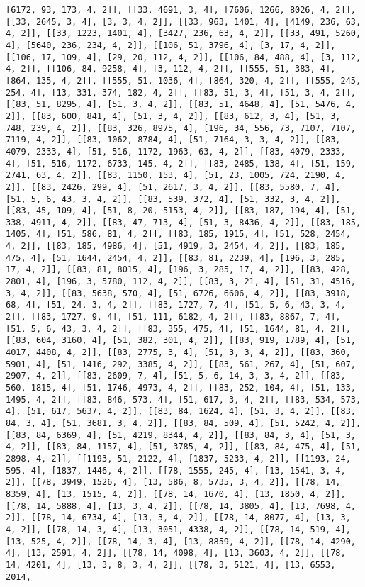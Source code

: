 \documentclass[12pt,fleqn]{article}\usepackage{../../common}
\begin{document}
\begin{verbatim}
[6172, 93, 173, 4, 2]], [[33, 4691, 3, 4], [7606, 1266, 8026, 4, 2]], [[33, 2645, 3, 4], [3, 3, 4, 2]], [[33, 963, 1401, 4], [4149, 236, 63, 4, 2]], [[33, 1223, 1401, 4], [3427, 236, 63, 4, 2]], [[33, 491, 5260, 4], [5640, 236, 234, 4, 2]], [[106, 51, 3796, 4], [3, 17, 4, 2]], [[106, 17, 109, 4], [29, 20, 112, 4, 2]], [[106, 84, 488, 4], [3, 112, 4, 2]], [[106, 84, 9258, 4], [3, 112, 4, 2]], [[555, 51, 383, 4], [864, 135, 4, 2]], [[555, 51, 1036, 4], [864, 320, 4, 2]], [[555, 245, 254, 4], [13, 331, 374, 182, 4, 2]], [[83, 51, 3, 4], [51, 3, 4, 2]], [[83, 51, 8295, 4], [51, 3, 4, 2]], [[83, 51, 4648, 4], [51, 5476, 4, 2]], [[83, 600, 841, 4], [51, 3, 4, 2]], [[83, 612, 3, 4], [51, 3, 748, 239, 4, 2]], [[83, 326, 8975, 4], [196, 34, 556, 73, 7107, 7107, 7119, 4, 2]], [[83, 1062, 8784, 4], [51, 7164, 3, 3, 4, 2]], [[83, 4079, 2333, 4], [51, 516, 1172, 1963, 63, 4, 2]], [[83, 4079, 2333, 4], [51, 516, 1172, 6733, 145, 4, 2]], [[83, 2485, 138, 4], [51, 159, 2741, 63, 4, 2]], [[83, 1150, 153, 4], [51, 23, 1005, 724, 2190, 4, 2]], [[83, 2426, 299, 4], [51, 2617, 3, 4, 2]], [[83, 5580, 7, 4], [51, 5, 6, 43, 3, 4, 2]], [[83, 539, 372, 4], [51, 332, 3, 4, 2]], [[83, 45, 109, 4], [51, 8, 20, 5153, 4, 2]], [[83, 187, 194, 4], [51, 338, 4911, 4, 2]], [[83, 47, 713, 4], [51, 3, 8436, 4, 2]], [[83, 185, 1405, 4], [51, 586, 81, 4, 2]], [[83, 185, 1915, 4], [51, 528, 2454, 4, 2]], [[83, 185, 4986, 4], [51, 4919, 3, 2454, 4, 2]], [[83, 185, 475, 4], [51, 1644, 2454, 4, 2]], [[83, 81, 2239, 4], [196, 3, 285, 17, 4, 2]], [[83, 81, 8015, 4], [196, 3, 285, 17, 4, 2]], [[83, 428, 2801, 4], [196, 3, 5780, 112, 4, 2]], [[83, 3, 21, 4], [51, 31, 4516, 3, 4, 2]], [[83, 5638, 570, 4], [51, 6726, 6606, 4, 2]], [[83, 3918, 68, 4], [51, 24, 3, 4, 2]], [[83, 1727, 7, 4], [51, 5, 6, 43, 3, 4, 2]], [[83, 1727, 9, 4], [51, 111, 6182, 4, 2]], [[83, 8867, 7, 4], [51, 5, 6, 43, 3, 4, 2]], [[83, 355, 475, 4], [51, 1644, 81, 4, 2]], [[83, 604, 3160, 4], [51, 382, 301, 4, 2]], [[83, 919, 1789, 4], [51, 4017, 4408, 4, 2]], [[83, 2775, 3, 4], [51, 3, 3, 4, 2]], [[83, 360, 5901, 4], [51, 1416, 292, 3385, 4, 2]], [[83, 561, 267, 4], [51, 607, 2907, 4, 2]], [[83, 2609, 7, 4], [51, 5, 6, 14, 3, 3, 4, 2]], [[83, 560, 1815, 4], [51, 1746, 4973, 4, 2]], [[83, 252, 104, 4], [51, 133, 1495, 4, 2]], [[83, 846, 573, 4], [51, 617, 3, 4, 2]], [[83, 534, 573, 4], [51, 617, 5637, 4, 2]], [[83, 84, 1624, 4], [51, 3, 4, 2]], [[83, 84, 3, 4], [51, 3681, 3, 4, 2]], [[83, 84, 509, 4], [51, 5242, 4, 2]], [[83, 84, 6369, 4], [51, 4219, 8344, 4, 2]], [[83, 84, 3, 4], [51, 3, 4, 2]], [[83, 84, 1157, 4], [51, 3785, 4, 2]], [[83, 84, 475, 4], [51, 2898, 4, 2]], [[1193, 51, 2122, 4], [1837, 5233, 4, 2]], [[1193, 24, 595, 4], [1837, 1446, 4, 2]], [[78, 1555, 245, 4], [13, 1541, 3, 4, 2]], [[78, 3949, 1526, 4], [13, 586, 8, 5735, 3, 4, 2]], [[78, 14, 8359, 4], [13, 1515, 4, 2]], [[78, 14, 1670, 4], [13, 1850, 4, 2]], [[78, 14, 5888, 4], [13, 3, 4, 2]], [[78, 14, 3805, 4], [13, 7698, 4, 2]], [[78, 14, 6734, 4], [13, 3, 4, 2]], [[78, 14, 8077, 4], [13, 3, 4, 2]], [[78, 14, 3, 4], [13, 3051, 4338, 4, 2]], [[78, 14, 519, 4], [13, 525, 4, 2]], [[78, 14, 3, 4], [13, 8859, 4, 2]], [[78, 14, 4290, 4], [13, 2591, 4, 2]], [[78, 14, 4098, 4], [13, 3603, 4, 2]], [[78, 14, 4201, 4], [13, 3, 8, 3, 4, 2]], [[78, 3, 5121, 4], [13, 6553, 2014, 
\end{verbatim}
\end{document}
